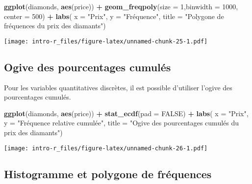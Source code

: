\documentclass[]{book}
\newenvironment{Shaded}{\begin{snugshade}}{\end{snugshade}}
\newcommand{\KeywordTok}[1]{\textcolor[rgb]{0.13,0.29,0.53}{\textbf{#1}}}
\newcommand{\DataTypeTok}[1]{\textcolor[rgb]{0.13,0.29,0.53}{#1}}
\newcommand{\DecValTok}[1]{\textcolor[rgb]{0.00,0.00,0.81}{#1}}
\newcommand{\StringTok}[1]{\textcolor[rgb]{0.31,0.60,0.02}{#1}}
\newcommand{\OtherTok}[1]{\textcolor[rgb]{0.56,0.35,0.01}{#1}}
\newcommand{\OperatorTok}[1]{\textcolor[rgb]{0.81,0.36,0.00}{\textbf{#1}}}
\newcommand{\NormalTok}[1]{#1}
\begin{document}
\begin{Shaded}
\begin{Highlighting}[]
\KeywordTok{ggplot}\NormalTok{(diamonds, }\KeywordTok{aes}\NormalTok{(price)) }\OperatorTok{+}\StringTok{ }
\StringTok{  }\KeywordTok{geom_freqpoly}\NormalTok{(}\DataTypeTok{size =} \DecValTok{1}\NormalTok{,}\DataTypeTok{binwidth =} \DecValTok{1000}\NormalTok{, }\DataTypeTok{center =} \DecValTok{500}\NormalTok{) }\OperatorTok{+}\StringTok{ }
\StringTok{  }\KeywordTok{labs}\NormalTok{(}
    \DataTypeTok{x =} \StringTok{"Prix"}\NormalTok{, }
    \DataTypeTok{y =} \StringTok{"Fréquence"}\NormalTok{, }
    \DataTypeTok{title =} \StringTok{"Polygone de fréquences du prix des diamants"}\NormalTok{)}
\end{Highlighting}
\end{Shaded}

\texttt{[image: intro-r\_files/figure-latex/unnamed-chunk-25-1.pdf]}

\subsection{Ogive des pourcentages
cumulés}\label{ogive-des-pourcentages-cumules}

Pour les variables quantitatives discrètes, il est possible d'utiliser
l'ogive des pourcentages cumulés.

\begin{Shaded}
\begin{Highlighting}[]
\KeywordTok{ggplot}\NormalTok{(diamonds, }\KeywordTok{aes}\NormalTok{(price)) }\OperatorTok{+}\StringTok{ }
\StringTok{  }\KeywordTok{stat_ecdf}\NormalTok{(}\DataTypeTok{pad =} \OtherTok{FALSE}\NormalTok{) }\OperatorTok{+}\StringTok{ }
\StringTok{  }\KeywordTok{labs}\NormalTok{(}
    \DataTypeTok{x =} \StringTok{"Prix"}\NormalTok{, }
    \DataTypeTok{y =} \StringTok{"Fréquence relative cumulée"}\NormalTok{, }
    \DataTypeTok{title =} \StringTok{"Ogive des pourcentages cumulés du prix des diamants"}\NormalTok{)}
\end{Highlighting}
\end{Shaded}

\texttt{[image: intro-r\_files/figure-latex/unnamed-chunk-26-1.pdf]}

\subsection{Histogramme et polygone de
fréquences}\label{histogramme-et-polygone-de-frequences}
\end{document}
